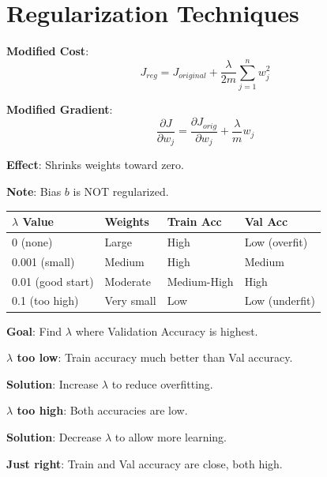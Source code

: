 \documentclass[11pt,a4paper]{article}
\begin{document}
\section{Regularization Techniques}

\begin{definitionbox}

\textbf{Modified Cost}:
\[J_{reg} = J_{original} + \frac{\lambda}{2m}\sum_{j=1}^{n} w_j^2\]

\textbf{Modified Gradient}:
\[\frac{\partial J}{\partial w_j} = \frac{\partial J_{orig}}{\partial w_j} + \frac{\lambda}{m}w_j\]

\textbf{Effect}: Shrinks weights toward zero.

\textbf{Note}: Bias $b$ is NOT regularized.
\end{definitionbox}

\begin{examplebox}

\begin{tabular}{@{}l|l|l|l@{}}
\textbf{$\lambda$ Value} & \textbf{Weights} & \textbf{Train Acc} & \textbf{Val Acc} \\
\hline
0 (none) & Large & High & Low (overfit) \\
0.001 (small) & Medium & High & Medium \\
0.01 (good start) & Moderate & Medium-High & High \\
0.1 (too high) & Very small & Low & Low (underfit) \\
\end{tabular}

\textbf{Goal}: Find $\lambda$ where Validation Accuracy is highest.
\end{examplebox}

\begin{warningbox}

\textbf{$\lambda$ too low}: Train accuracy much better than Val accuracy.

\textbf{Solution}: Increase $\lambda$ to reduce overfitting.

\textbf{$\lambda$ too high}: Both accuracies are low.

\textbf{Solution}: Decrease $\lambda$ to allow more learning.

\textbf{Just right}: Train and Val accuracy are close, both high.
\end{warningbox}
\end{document}
